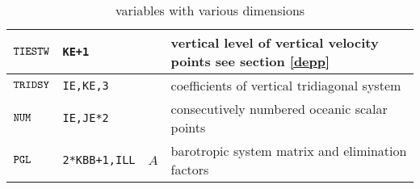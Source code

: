 \begin{table}[!bh]
\begin{footnotesize}
{{\begin{tabular}{|l|l|c|l|}
$\mbox{\tt TIESTW}$ & {\tt KE+1} &  & vertical level of vertical velocity points see section \ref{depp}   \\ \hline
$\mbox{\tt TRIDSY}$ & {\tt IE,KE,3} &  & coefficients of vertical tridiagonal system    \\ \hline
$\mbox{\tt NUM}$ & {\tt IE,JE*2} &  & consecutively numbered oceanic scalar points    \\ \hline
$\mbox{\tt PGL}$ & {\tt 2*KBB+1,ILL} & $A$ & barotropic system matrix and elimination factors   \\ \hline
\end{tabular}}}
\caption{ variables with various dimensions}
\end{footnotesize}
\end{table}


\begin{table}[!bh]
\end{table}




\clearpage

